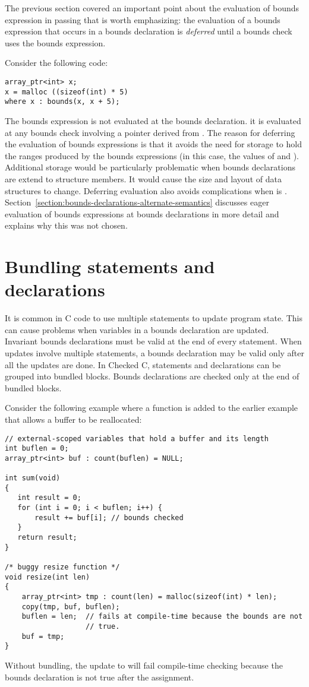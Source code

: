 The previous section covered an important point about the evaluation of
bounds expression in passing that is worth emphasizing:
the evaluation of a bounds expression that occurs in
a bounds declaration is {\em deferred} until a bounds check uses the
bounds expression.

Consider the following code:

\begin{lstlisting}
array_ptr<int> x;
x = malloc ((sizeof(int) * 5)
where x : bounds(x, x + 5);
\end{lstlisting}

The bounds expression  is not evaluated at the
bounds declaration.   it is evaluated at any bounds check involving a
pointer derived from .  The reason for deferring the
evaluation of bounds expressions is that it avoids the need for
storage to hold the ranges produced by the bounds
expressions (in this case, the values of  and ).
Additional storage would be particularly
problematic when bounds declarations are extend to structure members.
It would cause the size and layout of data structures to change.
Deferring evaluation also avoids complications when  is
. Section~\ref{section:bounds-declarations-alternate-semantics}
discusses eager evaluation of bounds expressions at
bounds declarations in more detail and explains why this was not chosen.

\section{Bundling statements and declarations}

It is common in C code to use multiple statements to update program state.
This can cause problems when variables in a bounds declaration are updated.
Invariant bounds declarations must be valid at the end of every statement.
When updates involve multiple statements, a bounds declaration may be valid only
after all the updates are done.  In Checked C, statements and declarations can be
grouped into bundled blocks.  Bounds declarations are checked only at the end of bundled blocks.

Consider the following example where a function is added to the earlier 
example that allows a buffer to be reallocated:
\begin{lstlisting}
// external-scoped variables that hold a buffer and its length
int buflen = 0;
array_ptr<int> buf : count(buflen) = NULL;

int sum(void)
{
   int result = 0;
   for (int i = 0; i < buflen; i++) {
       result += buf[i]; // bounds checked
   }
   return result;
}

/* buggy resize function */
void resize(int len)
{
    array_ptr<int> tmp : count(len) = malloc(sizeof(int) * len);
    copy(tmp, buf, buflen);
    buflen = len;  // fails at compile-time because the bounds are not
                   // true.
    buf = tmp;
}
\end{lstlisting}
Without bundling, the update to  will fail
compile-time checking because the bounds declaration is not true after the
assignment.

